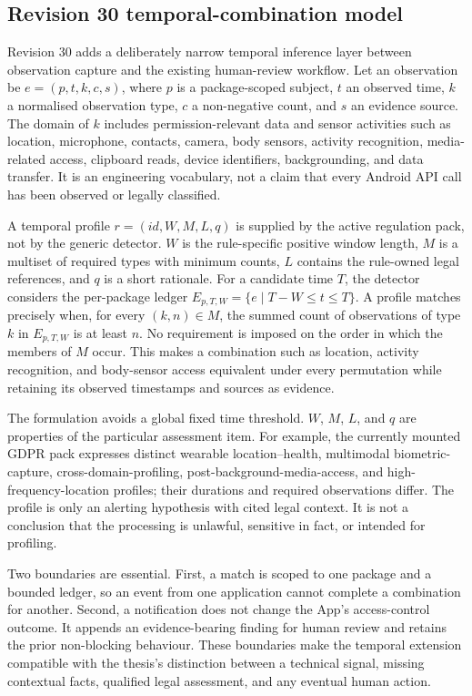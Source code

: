 

\subsection{Revision 30 temporal-combination model}

Revision 30 adds a deliberately narrow temporal inference layer between observation capture and the existing human-review workflow. Let an observation be $e=(p,t,k,c,s)$, where $p$ is a package-scoped subject, $t$ an observed time, $k$ a normalised observation type, $c$ a non-negative count, and $s$ an evidence source. The domain of $k$ includes permission-relevant data and sensor activities such as location, microphone, contacts, camera, body sensors, activity recognition, media-related access, clipboard reads, device identifiers, backgrounding, and data transfer. It is an engineering vocabulary, not a claim that every Android API call has been observed or legally classified.

A temporal profile $r=(id,W,M,L,q)$ is supplied by the active regulation pack, not by the generic detector. $W$ is the rule-specific positive window length, $M$ is a multiset of required types with minimum counts, $L$ contains the rule-owned legal references, and $q$ is a short rationale. For a candidate time $T$, the detector considers the per-package ledger $E_{p,T,W}=\{e \mid T-W \leq t \leq T\}$. A profile matches precisely when, for every $(k,n)\in M$, the summed count of observations of type $k$ in $E_{p,T,W}$ is at least $n$. No requirement is imposed on the order in which the members of $M$ occur. This makes a combination such as location, activity recognition, and body-sensor access equivalent under every permutation while retaining its observed timestamps and sources as evidence.

The formulation avoids a global fixed time threshold. $W$, $M$, $L$, and $q$ are properties of the particular assessment item. For example, the currently mounted GDPR pack expresses distinct wearable location--health, multimodal biometric-capture, cross-domain-profiling, post-background-media-access, and high-frequency-location profiles; their durations and required observations differ. The profile is only an alerting hypothesis with cited legal context. It is not a conclusion that the processing is unlawful, sensitive in fact, or intended for profiling.

Two boundaries are essential. First, a match is scoped to one package and a bounded ledger, so an event from one application cannot complete a combination for another. Second, a notification does not change the App's access-control outcome. It appends an evidence-bearing finding for human review and retains the prior non-blocking behaviour. These boundaries make the temporal extension compatible with the thesis's distinction between a technical signal, missing contextual facts, qualified legal assessment, and any eventual human action.
